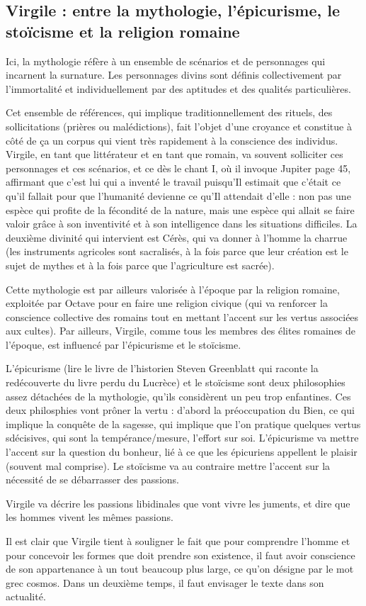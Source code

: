 \documentclass[a4paper,12pt]{book}
\begin{document}
\subsection{Virgile : entre la mythologie, l'épicurisme, le stoïcisme et la religion romaine}
Ici, la mythologie réfère à un ensemble de scénarios et de personnages qui incarnent la surnature. Les personnages divins sont définis collectivement par l'immortalité et individuellement par des aptitudes et des qualités particulières.
\par Cet ensemble de références, qui implique traditionnellement des rituels, des sollicitations (prières ou malédictions), fait l'objet d'une croyance et constitue à côté de ça un corpus qui vient très rapidement à la conscience des individus. Virgile, en tant que littérateur et en tant que romain, va souvent solliciter ces personnages et ces scénarios, et ce dès le chant I, où il invoque Jupiter page 45, affirmant que c'est lui qui a inventé le travail puisqu'Il estimait que c'était ce qu'il fallait pour que l'humanité devienne ce qu'Il attendait d'elle : non pas une espèce qui profite de la fécondité de la nature, mais une espèce qui allait se faire valoir grâce à son inventivité et à son intelligence dans les situations difficiles. La deuxième divinité qui intervient est Cérès, qui va donner à l'homme la charrue (les instruments agricoles sont sacralisés, à la fois parce que leur création est le sujet de mythes et à la fois parce que l'agriculture est sacrée).
\par Cette mythologie est par ailleurs valorisée à l'époque par la religion romaine, exploitée par Octave pour en faire une religion civique (qui va renforcer la conscience collective des romains tout en mettant l'accent sur les vertus associées aux cultes). Par ailleurs, Virgile, comme tous les membres des élites romaines de l'époque, est influencé par l'épicurisme et le stoïcisme.
\par L'épicurisme (lire le livre de l'historien Steven Greenblatt qui raconte la redécouverte du livre perdu du Lucrèce) et le stoïcisme sont deux philosophies assez détachées de la mythologie, qu'ils considèrent un peu trop enfantines. Ces deux philosphies vont prôner la vertu : d'abord la préoccupation du Bien, ce qui implique la conquête de la sagesse, qui implique que l'on pratique quelques vertus sdécisives, qui sont la tempérance/mesure, l'effort sur soi. L'épicurisme va mettre l'accent sur la question du bonheur, lié à ce que les épicuriens appellent le plaisir (souvent mal comprise). Le stoïcisme va au contraire mettre l'accent sur la nécessité de se débarrasser des passions.
\par Virgile va décrire les passions libidinales que vont vivre les juments, et dire que les hommes vivent les mêmes passions.
\par Il est clair que Virgile tient à souligner le fait que pour comprendre l'homme et pour concevoir les formes que doit prendre son existence, il faut avoir conscience de son appartenance à un tout beaucoup plus large, ce qu'on désigne par le mot grec cosmos. Dans un deuxième temps, il faut envisager le texte dans son actualité.
\end{document}
